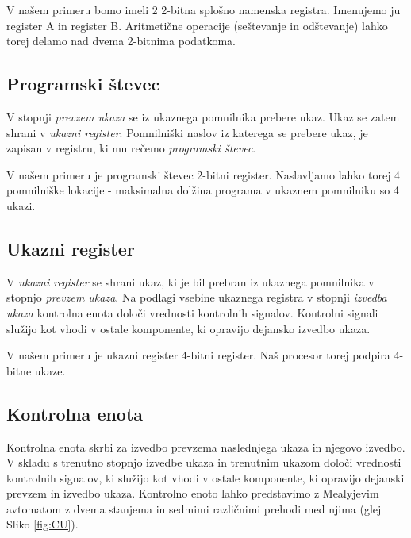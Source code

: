 V našem primeru bomo imeli 2 2-bitna splošno namenska registra. Imenujemo ju register A in register B. Aritmetične operacije (seštevanje in odštevanje) lahko torej delamo nad dvema 2-bitnima podatkoma.

\subsection{Programski števec}
V stopnji \emph{prevzem ukaza} se iz ukaznega pomnilnika prebere ukaz. Ukaz se zatem shrani v \emph{ukazni register}. Pomnilniški naslov iz katerega se prebere ukaz, je zapisan v registru, ki mu rečemo \emph{programski števec}. 

V našem primeru je programski števec 2-bitni register. Naslavljamo lahko torej 4 pomnilniške lokacije - maksimalna dolžina programa v ukaznem pomnilniku so 4 ukazi.

\subsection{Ukazni register}
V \emph{ukazni register} se shrani ukaz, ki je bil prebran iz ukaznega pomnilnika v stopnjo \emph{prevzem ukaza}. Na podlagi vsebine ukaznega registra v stopnji \emph{izvedba ukaza} kontrolna enota določi vrednosti kontrolnih signalov. Kontrolni signali služijo kot vhodi v ostale komponente, ki opravijo dejansko izvedbo ukaza.

V našem primeru je ukazni register 4-bitni register. Naš procesor torej podpira 4-bitne ukaze. 

\subsection{Kontrolna enota}
Kontrolna enota skrbi za izvedbo prevzema naslednjega ukaza in njegovo izvedbo. V skladu s trenutno stopnjo izvedbe ukaza in trenutnim ukazom določi vrednosti kontrolnih signalov, ki služijo kot vhodi v ostale komponente, ki opravijo dejanski prevzem in izvedbo ukaza. Kontrolno enoto lahko predstavimo z Mealyjevim avtomatom z dvema stanjema in sedmimi različnimi prehodi med njima (glej Sliko \ref{fig:CU}). 

